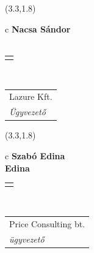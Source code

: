 \documentclass[11pt]{article}
\begin{document}
\makebox(3.3,1.8){
  \renewcommand\arraystretch{1.3}
  \begin{tabular}[c]{c}
    \hspace{8.5mm}
    \LARGE\bf{ Nacsa Sándor }\\
    \hspace{8.5mm}
    \Large{  }\\
    \renewcommand\arraystretch{3}
    \begin{tabular}[c]{c}
      \centering
      \fontfamily{phv}\selectfont{
        \textbf{
          \textsc{
            \scriptsize{
            \color{Dark}{ Ismerkedő }\color{Bright}{ Webmester }\color{Bright}{ Sminkmester }\color{Bright}{ Programozó }
            }
          }
        }
      }
    \end{tabular}
    \\
    \renewcommand\arraystretch{1}
    \begin{tabular}{p{3.3in}}
      \hspace{.7cm}Lazure Kft.\\
      \hspace{.7cm}\emph{ Ügyvezető }\\
    \end{tabular}
  \end{tabular}
}

\makebox(3.3,1.8){
  \renewcommand\arraystretch{1.3}
  \begin{tabular}[c]{c}
    \hspace{8.5mm}
    \LARGE\bf{ Szabó Edina }\\
    \hspace{8.5mm}
    \Large{ Edina }\\
    \renewcommand\arraystretch{3}
    \begin{tabular}[c]{c}
      \centering
      \fontfamily{phv}\selectfont{
        \textbf{
          \textsc{
            \scriptsize{
            \color{Dark}{ Ismerkedő }\color{Bright}{ Webmester }\color{Bright}{ Sminkmester }\color{Bright}{ Programozó }
            }
          }
        }
      }
    \end{tabular}
    \\
    \renewcommand\arraystretch{1}
    \begin{tabular}{p{3.3in}}
      \hspace{.7cm}Price Consulting bt.\\
      \hspace{.7cm}\emph{ ügyvezető }\\
    \end{tabular}
  \end{tabular}
}
\end{document}
